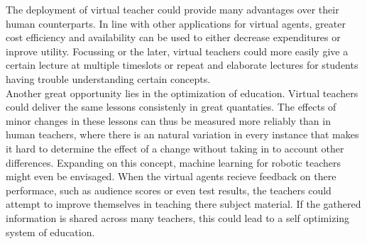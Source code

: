 The deployment of virtual teacher could provide many advantages over their human counterparts. In line with other applications for virtual agents, greater cost efficiency and availability can be used to either decrease expenditures or inprove utility. Focussing or the later, virtual teachers could more easily give a certain lecture at multiple timeslots or repeat and elaborate lectures for students having trouble understanding certain concepts.\\

Another great opportunity lies in the optimization of education. Virtual teachers could deliver the same lessons consistenly in great quantaties. The effects of minor changes in these lessons can thus be measured more reliably than in human teachers, where there is an natural variation in every instance that makes it hard to determine the effect of a change without taking in to account other differences. Expanding on this concept, machine learning for robotic teachers might even be envisaged. When the virtual agents recieve feedback on there performace, such as audience scores or even test results, the teachers could attempt to improve themselves in teaching there subject material. If the gathered information is shared across many teachers, this could lead to a self optimizing system of education. 